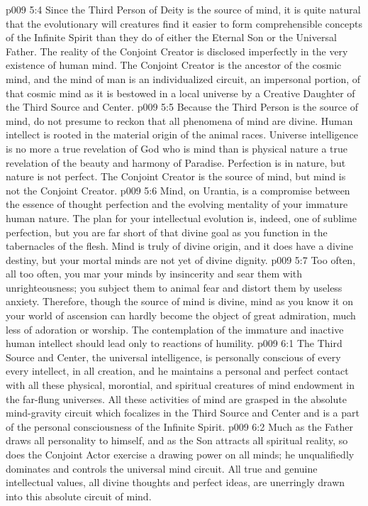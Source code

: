 \vs p009 5:4 \pc Since the Third Person of Deity is the source of mind, it is quite natural that the evolutionary will creatures find it easier to form comprehensible concepts of the Infinite Spirit than they do of either the Eternal Son or the Universal Father. The reality of the Conjoint Creator is disclosed imperfectly in the very existence of human mind. The Conjoint Creator is the ancestor of the cosmic mind, and the mind of man is an individualized circuit, an impersonal portion, of that cosmic mind as it is bestowed in a local universe by a Creative Daughter of the Third Source and Center.
\vs p009 5:5 \pc Because the Third Person is the source of mind, do not presume to reckon that all phenomena of mind are divine. Human intellect is rooted in the material origin of the animal races. Universe intelligence is no more a true revelation of God who is mind than is physical nature a true revelation of the beauty and harmony of Paradise. Perfection is in nature, but nature is not perfect. The Conjoint Creator is the source of mind, but mind is not the Conjoint Creator.
\vs p009 5:6 Mind, on Urantia, is a compromise between the essence of thought perfection and the evolving mentality of your immature human nature. The plan for your intellectual evolution is, indeed, one of sublime perfection, but you are far short of that divine goal as you function in the tabernacles of the flesh. Mind is truly of divine origin, and it does have a divine destiny, but your mortal minds are not yet of divine dignity.
\vs p009 5:7 Too often, all too often, you mar your minds by insincerity and sear them with unrighteousness; you subject them to animal fear and distort them by useless anxiety. Therefore, though the source of mind is divine, mind as you know it on your world of ascension can hardly become the object of great admiration, much less of adoration or worship. The contemplation of the immature and inactive human intellect should lead only to reactions of humility.
\vs p009 6:1 The Third Source and Center, the universal intelligence, is personally conscious of every  every intellect, in all creation, and he maintains a personal and perfect contact with all these physical, morontial, and spiritual creatures of mind endowment in the far\hyp{}flung universes. All these activities of mind are grasped in the absolute mind\hyp{}gravity circuit which focalizes in the Third Source and Center and is a part of the personal consciousness of the Infinite Spirit.
\vs p009 6:2 Much as the Father draws all personality to himself, and as the Son attracts all spiritual reality, so does the Conjoint Actor exercise a drawing power on all minds; he unqualifiedly dominates and controls the universal mind circuit. All true and genuine intellectual values, all divine thoughts and perfect ideas, are unerringly drawn into this absolute circuit of mind.
